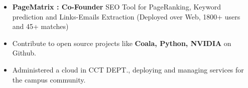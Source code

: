 \vspace{-0.2cm}


{\fontsize{11pt}{1em}\bodyfontlight\upshape\color{text}
\begin{itemize}
  \itemsep-0.3em
  \item \textbf{PageMatrix : Co-Founder} SEO Tool for PageRanking, Keyword prediction
   and Links-Emails Extraction (Deployed over Web, 1800+ users and 45+ matches) 	
  \item Contribute to open source projects like \textbf{Coala, Python, NVIDIA} on Github.
  \item Administered a cloud in CCT DEPT., deploying and managing services for the campus community.
\end{itemize}
}

